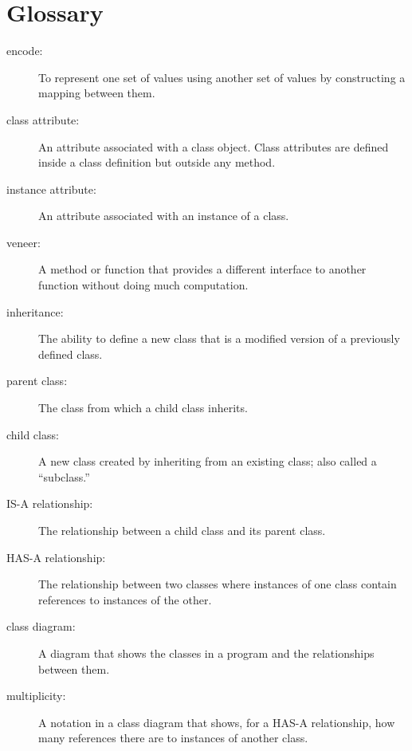\documentclass[10pt]{book}
\begin{document}
\section{Glossary}

\begin{description}

\item[encode:]  To represent one set of values using another
set of values by constructing a mapping between them.

\item[class attribute:] An attribute associated with a class
object.  Class attributes are defined inside
a class definition but outside any method.

\item[instance attribute:] An attribute associated with an
instance of a class.

\item[veneer:] A method or function that provides a different
interface to another function without doing much computation.

\item[inheritance:] The ability to define a new class that is a
modified version of a previously defined class.

\item[parent class:] The class from which a child class inherits.

\item[child class:] A new class created by inheriting from an
existing class; also called a ``subclass.''

\item[IS-A relationship:] The relationship between a child class
and its parent class.

\item[HAS-A relationship:] The relationship between two classes
where instances of one class contain references to instances of
the other.

\item[class diagram:] A diagram that shows the classes in a program
and the relationships between them.

\item[multiplicity:] A notation in a class diagram that shows, for
a HAS-A relationship, how many references there are to instances
of another class.

\end{description}
\end{document}
